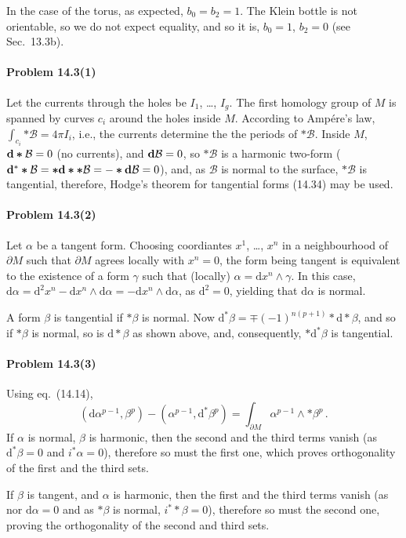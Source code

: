 \documentclass[a4paper,12pt]{article}
\def\d{\mathrm{d}}
\newcommand{\problem}[1]{\paragraph{Problem #1}}
\begin{document}
In the case of the torus, as expected, $b_0 = b_2=1$. The Klein bottle is not orientable, so we do not expect equality, and so it is, $b_0 = 1$, $b_2=0$ (see Sec.\ 13.3b).


\problem{14.3(1)} Let the currents through the holes be $I_1$, \dots, $I_g$. The first homology group of $M$ is spanned by curves $c_i$ around the holes inside $M$. According to Ampére's law, $\int_{c_i} \boldsymbol{*}\mathcal{B} = 4\pi I_i$, i.e., the currents determine the the periods of $\boldsymbol{*}\mathcal{B}$. Inside $M$, ${\bf d}\boldsymbol{*}\mathcal{B} = 0$ (no currents), and ${\bf d}\mathcal{B}=0$, so $\boldsymbol{*}\mathcal{B}$ is a harmonic two-form (${\bf d}^* \boldsymbol{*}\mathcal{B} = \boldsymbol{*}{\bf d}\boldsymbol{*} \boldsymbol{*}\mathcal{B} = -\boldsymbol{*}{\bf d}\mathcal{B} =0$), and, as $\mathcal{B}$ is normal to the surface, $\boldsymbol{*}\mathcal{B}$ is tangential, therefore, Hodge's theorem for tangential forms (14.34) may be used.


\problem{14.3(2)} Let $\alpha$ be a tangent form. Choosing coordiantes $x^1$, \dots, $x^n$  in a neighbourhood of $\partial M$ such that $\partial M$ agrees locally with $x^n=0$, the form being tangent is equivalent to the existence of a form $\gamma$ such that (locally) $\alpha = \d x^n \wedge \gamma$. In this case, $\d\alpha = \d^2 x^n - \d x^n \wedge \d\alpha = -\d x^n \wedge \d\alpha$, as $\d^2=0$, yielding that $\d\alpha$ is normal.

A form $\beta$ is tangential if $*\beta$ is normal. Now $\d^*\beta = \mp (-1)^{n(p+1)}*\d*\beta$, and so if $*\beta$ is normal, so is $\d*\beta$ as shown above, and, consequently, $*\d^*\beta$ is tangential.


\problem{14.3(3)} Using eq.\ (14.14),
\[
 (\d\alpha^{p-1}, \beta^p) -(\alpha^{p-1}, \d^*\beta^p) = \int_{\partial M}\alpha^{p-1}\wedge *\beta^p\,.
\]
If $\alpha$ is normal, $\beta$ is harmonic, then the second and the third terms vanish (as $\d^*\beta = 0$ and $i^*\alpha = 0$), therefore so must the first one, which proves orthogonality of the first and the third sets.

If $\beta$ is tangent, and $\alpha$ is harmonic, then the first and the third terms vanish (as nor $\d\alpha=0$ and as $*\beta$ is normal, $i^* *\beta=0$), therefore so must the second one, proving the orthogonality of the second and third sets.
\end{document}
